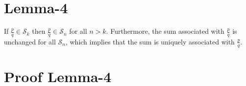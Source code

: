 \documentclass{article}
\begin{document}
% 
% 
% 

\section*{Lemma-4}

If \(\frac{p}{q} \in{} \mathcal{S}_k\) then \(\frac{p}{q} \in{} \mathcal{S}_n\) for all \(n > k\).
Furthermore, the sum associated with \(\frac{p}{q}\) is unchanged for all \(\mathcal{S}_n\),
which implies that the sum is uniquely associated with \(\frac{p}{q}\).

\section*{Proof Lemma-4}
\end{document}
